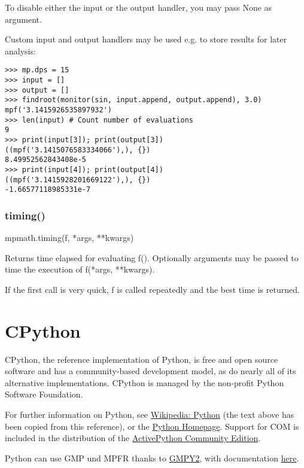 To disable either the input or the output handler, you may pass None as argument.

\vpara
Custom input and output handlers may be used e.g. to store results for later analysis:

\begin{lstlisting}
>>> mp.dps = 15
>>> input = []
>>> output = []
>>> findroot(monitor(sin, input.append, output.append), 3.0)
mpf('3.1415926535897932')
>>> len(input) # Count number of evaluations
9
>>> print(input[3]); print(output[3])
((mpf('3.1415076583334066'),), {})
8.49952562843408e-5
>>> print(input[4]); print(output[4])
((mpf('3.1415928201669122'),), {})
-1.66577118985331e-7
\end{lstlisting}

\subsubsection{timing()}

mpmath.timing(f, *args, **kwargs)

\vpara
Returns time elapsed for evaluating f(). Optionally arguments may be passed to time the execution of f(*args, **kwargs).

\vpara
If the first call is very quick, f is called repeatedly and the best time is returned.




\newpage
\section{CPython}

CPython, the reference implementation of Python, is free and open source software and has a community-based development model, as do nearly all of its alternative implementations. CPython is managed by the non-profit Python Software Foundation.

\vpara
For further information on Python, see \href{http://en.wikipedia.org/wiki/Python_(programming_language)}{Wikipedia: Python} (the text above has been copied from this reference), or the  \href{http://www.python.org/}{Python Homepage}. Support for COM is included in the distribution of the \href{http://www.activestate.com/activepython/downloads}{ActivePython Community Edition}.

\vpara
Python can use  GMP und MPFR thanks to \href{http://code.google.com/p/gmpy/}{GMPY2}, with documentation \href{https://gmpy2.readthedocs.org/en/latest/}{here}.

